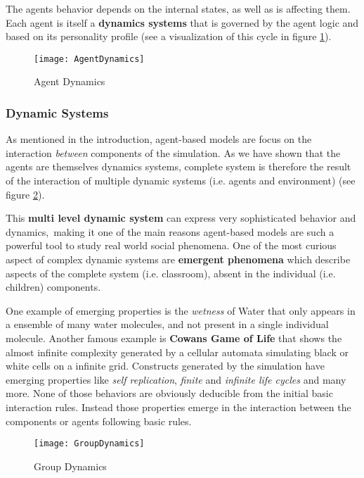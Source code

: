 The agents behavior depends on the internal states, as well as is affecting them.
Each agent is itself a \textbf{dynamics systems} that is governed by the agent logic and based
on its personality profile (see a visualization of this cycle in figure \ref{AgentDynamics}).

\begin{figure}[]
    \centering
    \texttt{[image: AgentDynamics]} 
    \caption{Agent Dynamics}
    \label{AgentDynamics}
\end{figure}

\subsubsection{Dynamic Systems}
As mentioned in the introduction, agent-based models are focus on the interaction
\textit{between} components of the simulation. As we have shown that the agents
are themselves dynamics systems, complete system is therefore the result of the
interaction of multiple dynamic systems (i.e. agents and environment)
(see figure \ref{GroupDynamics}). 

\bb

This \textbf{multi level dynamic system} can express very sophisticated behavior and dynamics,\
making it one of the main reasons agent-based models are such a powerful tool to study
real world social phenomena. One of the most curious aspect of complex dynamic systems
are \textbf{emergent phenomena}\cite{Corning2002} which describe aspects of the
complete system (i.e. classroom), absent in the individual (i.e. children) components.

\bb

One example of emerging properties is the \textit{wetness} of Water that only appears in a
ensemble of many water molecules, and not present in a single individual molecule. 
Another famous example is \textbf{Cowans Game of Life}\cite{Adamatzky2010}
that shows the almost infinite complexity generated by a cellular automata simulating
black or white cells on a infinite grid. Constructs generated by the simulation
have emerging properties like \textit{self replication}, \textit{finite} and
\textit{infinite life cycles} and many more. None of those behaviors are obviously deducible
from the initial basic interaction rules. Instead those properties emerge in the
interaction between the components or agents following basic rules.

\begin{figure}[]
    \centering
    \texttt{[image: GroupDynamics]} 
    \caption{Group Dynamics}
    \label{GroupDynamics}
\end{figure}

